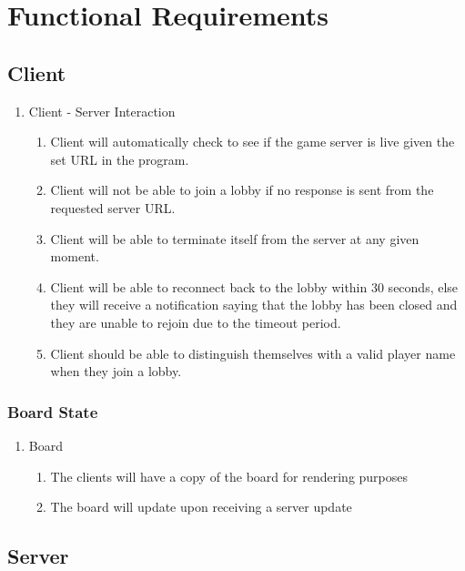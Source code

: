 \documentclass[10pt]{article}
\begin{document}
\section{Functional Requirements}

\subsection{Client}

\begin{enumerate}[label*=R\arabic*.]
    \item Client - Server Interaction
    \begin{enumerate}[label*=\arabic*.]
        \item Client will automatically check to see if the game server is live given the set URL in the program.
        \item Client will not be able to join a lobby if no response is sent from the requested server URL.
        \item Client will be able to terminate itself from the server at any given moment.
        \item Client will be able to reconnect back to the lobby within 30 seconds, else they will receive a notification saying that the lobby has been closed and they are unable to rejoin due to the timeout period.
        \item Client should be able to distinguish themselves with a valid player name when they join a lobby.
    \end{enumerate}
\end{enumerate}

\subsubsection{Board State}

\begin{enumerate}[resume*]
    \item Board
    \begin{enumerate}[label*=\arabic*.]
        \item The clients will have a copy of the board for rendering purposes
        \item The board will update upon receiving a server update
    \end{enumerate}
\end{enumerate}

\subsection{Server}
\end{document}
